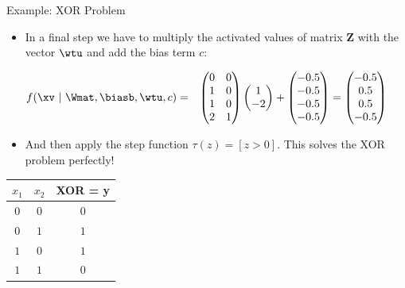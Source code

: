 \documentclass[11pt,compress,t,notes=noshow, xcolor=table]{beamer}
\begin{document}
\begin{vbframe}{Example: XOR Problem}
{\framebreak
  \begin{itemize}
    \item In a final step we have to multiply the activated values of matrix $\bm{Z}$ with the vector $\wtu$ and add the bias term $c$:
  \end{itemize}
  \begin{eqnarray*}
    f(\xv ~|~ \Wmat, \biasb, \wtu, c) &=&
    \begin{pmatrix}
      0 & 0 \\
      1 & 0 \\
      1 & 0 \\
      2 & 1
    \end{pmatrix}
    \begin{pmatrix}
      1 \\
      -2
    \end{pmatrix} + 
    \begin{pmatrix}
      - 0.5 \\
      - 0.5 \\
      - 0.5 \\
      - 0.5
    \end{pmatrix}
    =
    \begin{pmatrix}
      - 0.5 \\
      0.5 \\
      0.5 \\
      - 0.5
    \end{pmatrix}
  \end{eqnarray*}
  \begin{itemize}
    \item And then apply the step function $\tau(z) = [z > 0 ]$.  This solves the XOR problem perfectly!
  \end{itemize}
  \begin{table}
    \centering
      \begin{tabular}{ccc}
        \textbf{$x_1$}  & \textbf{$x_2$}  & \textbf{XOR} = y\\
        \hline
        \hline
        $0$             &   $0$           &  $0$ \\
        $0$             &   $1$           &  $1$ \\
        $1$             &   $0$           &  $1$ \\
        $1$             &   $1$           &  $0$
      \end{tabular}
  \end{table}
  }
\end{vbframe}
\end{document}
